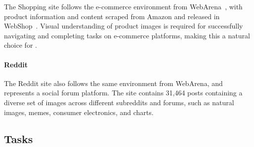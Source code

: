 The Shopping site follows the e-commerce environment from WebArena~\citep{zhou2023webarena}, with product information and content scraped from Amazon and released in WebShop~\citep{yao2022webshop}. Visual understanding of product images is required for successfully navigating and completing tasks on e-commerce platforms, making this a natural choice for \BenchmarkName{}. 

\paragraph{Reddit}

The Reddit site also follows the same environment from WebArena, and represents a social forum platform. The site contains 31,464 posts containing a diverse set of images across different subreddits and forums, such as natural images, memes, consumer electronics, and charts. 

\subsection{Tasks} \label{sec:tasks}




